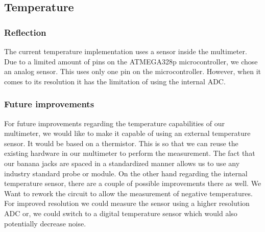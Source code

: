 \subsection{Temperature}
\label{sec:discussion_temperature}

\subsubsection{Reflection}
The current temperature implementation uses a sensor inside the multimeter. Due to a limited amount of pins on the ATMEGA328p microcontroller, we chose an analog sensor. This uses only one pin on the microcontroller. However, when it comes to its resolution it has the limitation of using the internal ADC.

\subsubsection{Future improvements}
For future improvements regarding the temperature capabilities of our multimeter, we would like to make it capable of using an external temperature sensor. It would be based on a thermistor. This is so that we can reuse the existing hardware in our multimeter to perform the measurement. The fact that our banana jacks are spaced in a standardized manner allows us to use any industry standard probe or module. On the other hand regarding the internal temperature sensor, there are a couple of possible improvements there as well. We Want to rework the circuit to allow the measurement of negative temperatures. For improved resolution we could measure the sensor using a higher resolution ADC or, we could switch to a digital temperature sensor which would also potentially decrease noise.